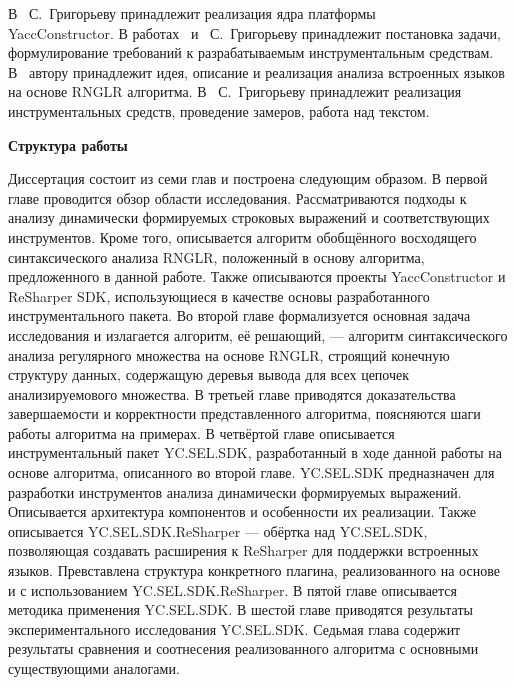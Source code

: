 В~\cite{YCArticle} С.~Григорьеву принадлежит реализация ядра платформы \\ YaccConstructor. В работах~\cite{SELforIDEru,AbstractGLL} и~\cite{SELforIDE} С.~Григорьеву принадлежит постановка задачи, формулирование требований к разрабатываемым инструментальным средствам. В~\cite{Grigorev6} автору принадлежит идея, описание и реализация анализа встроенных языков на основе RNGLR алгоритма. В~\cite{Syrcose} С.~Григорьеву принадлежит реализация инструментальных средств, проведение замеров, работа над текстом.


\textbf{Структура работы}

Диссертация состоит из семи глав и построена следующим образом. В первой главе проводится обзор области исследования. Рассматриваются подходы к анализу динамически формируемых строковых выражений и соответствующих инструментов. Кроме того, описывается алгоритм обобщённого восходящего синтаксического анализа RNGLR, положенный в основу алгоритма, предложенного в данной работе. Также описываются проекты YaccConstructor и ReSharper SDK, использующиеся в качестве основы разработанного инструментального пакета. Во второй главе формализуется основная задача исследования и излагается алгоритм, её решающий, --- алгоритм синтаксического анализа регулярного множества на основе RNGLR, строящий конечную структуру данных, содержащую деревья вывода для всех цепочек анализируемового множества. В третьей главе приводятся доказательства завершаемости и корректности представленного алгоритма, поясняются шаги работы алгоритма на примерах. В четвёртой главе описывается инструментальный пакет YC.SEL.SDK, разработанный в ходе данной работы на основе алгоритма, описанного во второй главе. YC.SEL.SDK предназначен для разработки инструментов анализа динамически формируемых выражений. Описывается архитектура компонентов и особенности их реализации. Также описывается YC.SEL.SDK.ReSharper --- обёртка над YC.SEL.SDK, позволяющая создавать расширения к ReSharper для поддержки встроенных языков. Превставлена структура конкретного плагина, реализованного на основе и с использованием YC.SEL.SDK.ReSharper. В пятой главе описывается методика применения YC.SEL.SDK.  В шестой главе приводятся результаты экспериментального исследования YC.SEL.SDK. Седьмая глава содержит результаты сравнения и соотнесения реализованного алгоритма с основными существующими аналогами.


\clearpage
